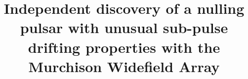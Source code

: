 \documentclass[linenumbers]{aastex631}
\begin{document}
\title{Independent discovery of a nulling pulsar with unusual sub-pulse
drifting properties with the Murchison Widefield Array}


\end{document}
